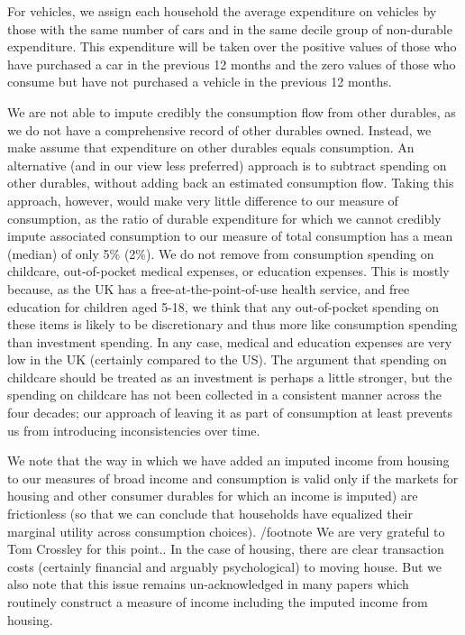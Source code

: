 For vehicles, we assign each household the average expenditure on vehicles by those with the same number of cars and in the same decile group of non-durable expenditure. This expenditure will be taken over the positive values of those who have purchased a car in the previous 12 months and the zero values of those who
consume but have not purchased a vehicle in the previous 12 months.

We are not able to impute credibly the consumption flow from other durables, as we do not have a comprehensive record of other durables owned. Instead, we make assume that expenditure on other durables equals consumption. An alternative (and in our view less preferred) approach is to subtract spending on other durables, without adding back an estimated consumption flow. Taking this approach, however, would make very little difference to our measure of consumption, as the ratio of durable expenditure for which we cannot credibly impute associated consumption to our measure of total consumption has a mean (median) of only 5\% (2\%).   We do not remove from consumption spending on childcare, out-of-pocket medical expenses, or education expenses. This is mostly because,  as the UK has a free-at-the-point-of-use health service, and free education for children aged  5-18, we think that any out-of-pocket spending on these items is likely to be discretionary and thus more like consumption spending than investment spending. In any case, medical and education expenses are very low in the UK (certainly compared to the US). The argument that spending on childcare should be treated as an investment is perhaps a little stronger, but the spending on childcare has not been collected in a consistent manner across the four decades; our approach of leaving it as part of consumption at least prevents us from introducing inconsistencies over time.

We note that the way in which we have added an imputed income from housing to our measures of broad income and consumption is valid only if the markets for housing and other consumer durables for which an income is imputed) are frictionless (so that we can conclude that households have equalized their marginal utility across consumption choices). /footnote{ We are very grateful to Tom Crossley for this point.}. In the case of housing, there are clear transaction costs (certainly financial and arguably psychological) to moving house. But we also note that this issue remains un-acknowledged in many papers which routinely construct a measure of income including the imputed income from housing.

